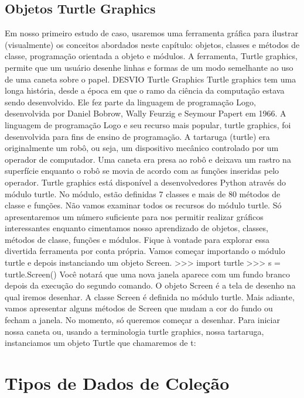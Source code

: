 			\subsection{Objetos Turtle Graphics}
			Em nosso primeiro estudo de caso, usaremos uma ferramenta gráfica para ilustrar (visualmente)
			os conceitos abordados neste capítulo: objetos, classes e métodos de classe, programação
			orientada a objeto e módulos. A ferramenta, Turtle graphics, permite que um usuário desenhe
			linhas e formas de um modo semelhante ao uso de uma caneta sobre o papel.
			DESVIO Turtle Graphics
			Turtle graphics tem uma longa história, desde a época em que o ramo da
			ciência da computação estava sendo desenvolvido. Ele fez parte da linguagem
			de programação Logo, desenvolvida por Daniel Bobrow, Wally Feurzig e
			Seymour Papert em 1966. A linguagem de programação Logo e seu recurso
			mais popular, turtle graphics, foi desenvolvida para fins de ensino de
			programação.
			A tartaruga (turtle) era originalmente um robô, ou seja, um dispositivo
			mecânico controlado por um operador de computador. Uma caneta era presa
			ao robô e deixava um rastro na superfície enquanto o robô se movia de acordo
			com as funções inseridas pelo operador.
			Turtle graphics está disponível a desenvolvedores Python através do módulo turtle. No
			módulo, estão definidas 7 classes e mais de 80 métodos de classe e funções. Não vamos examinar
			todos os recursos do módulo turtle. Só apresentaremos um número suficiente para nos permitir
			realizar gráficos interessantes enquanto cimentamos nosso aprendizado de objetos, classes,
			métodos de classe, funções e módulos. Fique à vontade para explorar essa divertida ferramenta
			por conta própria.
			Vamos começar importando o módulo turtle e depois instanciando um objeto Screen.
			>>> import turtle
			>>> s = turtle.Screen()
			Você notará que uma nova janela aparece com um fundo branco depois da execução do segundo
			comando. O objeto Screen é a tela de desenho na qual iremos desenhar. A classe Screen é
			definida no módulo turtle. Mais adiante, vamos apresentar alguns métodos de Screen que
			mudam a cor do fundo ou fecham a janela. No momento, só queremos começar a desenhar.
			Para iniciar nossa caneta ou, usando a terminologia turtle graphics, nossa tartaruga,
			instanciamos um objeto Turtle que chamaremos de t:
	
    \section{Tipos de Dados de Cole\c{c}\~{a}o}


